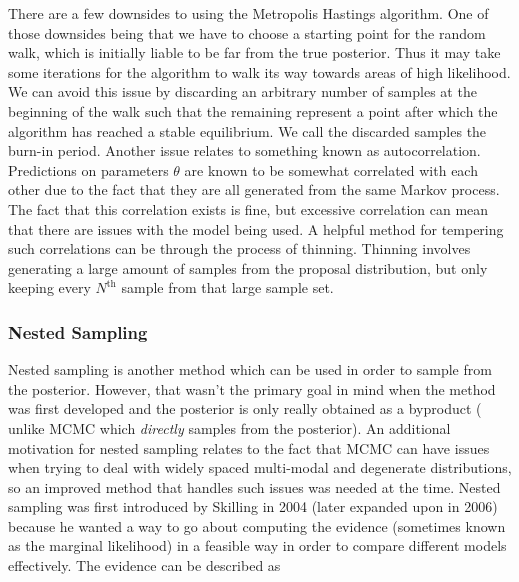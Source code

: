 %
%
There are a few downsides to using the Metropolis Hastings algorithm. One of those downsides being that we have to choose a starting point for the random walk, which is initially liable to be far from the true posterior. Thus it may take some iterations for the algorithm to walk its way towards areas of high likelihood. We can avoid this issue by discarding an arbitrary number of samples at the beginning of the walk such that the remaining represent a point after which the algorithm has reached a stable equilibrium. We call the discarded samples the burn-in period. Another issue relates to something known as autocorrelation. Predictions on parameters $\theta$ are known to be somewhat correlated with each other due to the fact that they are all generated from the same Markov process. The fact that this correlation exists is fine, but excessive correlation can mean that there are issues with the model being used. A helpful method for tempering such correlations can be through the process of thinning. Thinning involves generating a large amount of samples from the proposal distribution, but only keeping every $N^{\textrm{th}}$ sample from that large sample set. 

%
%

%
\subsubsection{Nested Sampling}

Nested sampling is another method which can be used in order to sample from the posterior. However, that wasn't the primary goal in mind when the method was first developed and the posterior is only really obtained as a byproduct (
unlike \ac{MCMC} which \textit{directly} samples from the posterior). An additional motivation for nested sampling relates to the fact that \ac{MCMC} can have issues when trying to deal with widely spaced multi-modal and degenerate distributions, so an improved method that handles such issues was needed at the time. Nested sampling was first introduced by Skilling in 2004 (later expanded upon in 2006) because he wanted a way to go about computing the evidence (sometimes known as the marginal likelihood) in a feasible way in order to compare different models effectively. The evidence can be described as

